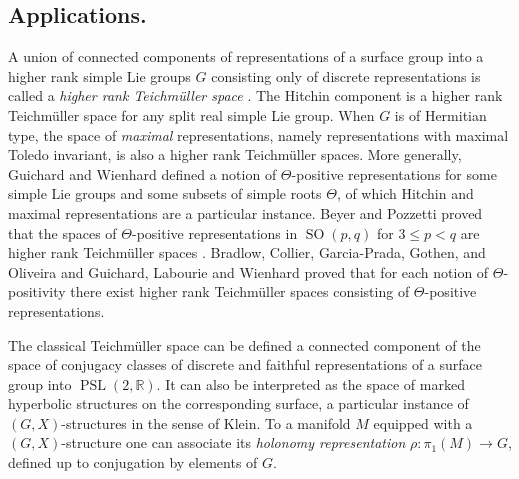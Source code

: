 \documentclass[reqno,10pt]{amsart}
\theoremstyle{plain}
\theoremstyle{definition}
\theoremstyle{remark}
\newcommand{\R}{\mathbb{R}}
\DeclareMathOperator{\PSL}{PSL}
\DeclareMathOperator{\SO}{SO}
\newcommand{\ie}{namely }
\begin{document}
\subsection{Applications.}

% 
 

A union of connected components of representations of a surface group into a higher rank simple Lie groups $G$ consisting only of discrete representations is called a \emph{higher rank Teichmüller space} \cite{WInvitation}. The Hitchin component is a higher rank Teichmüller space for any split real simple Lie group. When $G$ is of Hermitian type, the space of \emph{maximal} representations, \ie representations with maximal Toledo invariant, is also a higher rank Teichmüller spaces. More generally, Guichard and Wienhard defined a notion of
$\Theta$-positive representations for some simple Lie groups and some subsets of simple roots $\Theta$, of which Hitchin and maximal representations are a
particular instance. Beyer and Pozzetti proved that the spaces of $\Theta$-positive representations
in $\SO(p,q)$ for $3\leq p < q$ are higher rank Teichmüller spaces \cite{BeyerPozzetti}.
Bradlow, Collier, Garcia-Prada,  Gothen, and Oliveira \cite{magical} and Guichard, Labourie and Wienhard \cite{positivityLabourie} proved that for each notion of $\Theta$-positivity there exist higher rank Teichmüller spaces consisting of $\Theta$-positive representations. 

\medskip

The classical Teichmüller space can be defined a connected component of the space of conjugacy classes of discrete and faithful representations of a surface group into $\PSL(2,\R)$. It can also be interpreted as the space of marked hyperbolic structures on the corresponding surface, a particular instance of $(G,X)$-structures in the sense of Klein. %
To a manifold $M$ equipped with a $(G,X)$-structure one can associate its \emph{holonomy representation} $\rho:\pi_1(M)\to G$, defined up to conjugation by elements of $G$.
\end{document}
